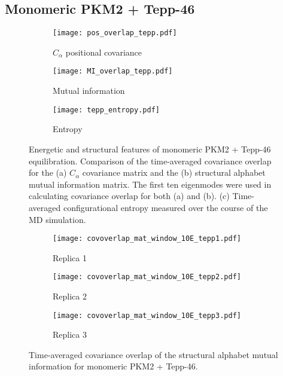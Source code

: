 \documentclass[11pt]{article}
\begin{document}
\subsection*{Monomeric PKM2 + Tepp-46}
\begin{figure}[!ht]
\centering
\begin{subfigure}[b]{.4\linewidth}
    \centering
    \texttt{[image: pos\_overlap\_tepp.pdf]}
    \caption{$C_\alpha$ positional covariance}\label{fig:3a}
  \end{subfigure}%
  \begin{subfigure}[b]{.4\linewidth}
    \centering
    \texttt{[image: MI\_overlap\_tepp.pdf]}
    \caption{Mutual information}\label{fig:3b}
  \end{subfigure}%
  \begin{subfigure}[b]{.4\linewidth}
    \centering
    \texttt{[image: tepp\_entropy.pdf]}
    \caption{Entropy}\label{fig:3b}
  \end{subfigure}%
\caption{Energetic and structural features of monomeric PKM2 + Tepp-46 equilibration. Comparison of the time-averaged covariance overlap for the (a) $C_\alpha$ covariance matrix and the (b) structural alphabet mutual information matrix. The first ten eigenmodes were used in calculating covariance overlap for both (a) and (b). (c) Time-averaged configurational entropy measured over the course of the MD simulation.}\label{fig:2}
\end{figure}
\begin{figure}[!ht]
\centering
\begin{subfigure}[b]{.4\linewidth}
    \centering
    \texttt{[image: covoverlap\_mat\_window\_10E\_tepp1.pdf]}
    \caption{Replica 1}\label{fig:4a}
  \end{subfigure}%
  \begin{subfigure}[b]{.4\linewidth}
    \centering
    \texttt{[image: covoverlap\_mat\_window\_10E\_tepp2.pdf]}
    \caption{Replica 2}\label{fig:3b}
  \end{subfigure}%
  \begin{subfigure}[b]{.4\linewidth}
    \centering
    \texttt{[image: covoverlap\_mat\_window\_10E\_tepp3.pdf]}
    \caption{Replica 3}\label{fig:3b}
  \end{subfigure}%
\caption{Time-averaged covariance overlap of the structural alphabet mutual information for monomeric PKM2 + Tepp-46.}\label{fig:2}
\end{figure}
\end{document}
